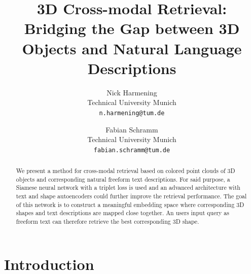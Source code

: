 \documentclass[10pt,twocolumn,letterpaper]{article}
\begin{document}
\title{3D Cross-modal Retrieval: Bridging the Gap between 3D Objects and Natural Language Descriptions}

\author{Nick Harmening\\
Technical University Munich\\
{\tt\small n.harmening@tum.de}
\and
Fabian Schramm\\
Technical University Munich\\
{\tt\small fabian.schramm@tum.de}
}

\maketitle

\begin{abstract}
   We present a method for cross-modal retrieval based on colored point clouds of 3D objects and corresponding natural freeform text descriptions. For said purpose, a Siamese neural network with a triplet loss is used and an advanced architecture with text and shape autoencoders could further improve the retrieval performance. The goal of this network is to construct a meaningful embedding space where corresponding 3D shapes and text descriptions are mapped close together. An users input query as freeform text can therefore retrieve the best corresponding 3D shape.
\end{abstract}

\section{Introduction}
\end{document}
